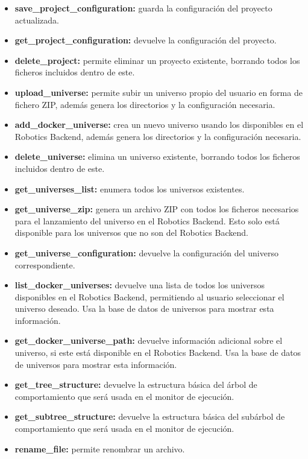 \begin{itemize}
    \item \textbf{save\_project\_configuration:} guarda la configuración del proyecto actualizada.
    \item \textbf{get\_project\_configuration:} devuelve la configuración del proyecto.
    \item \textbf{delete\_project:} permite eliminar un proyecto existente, borrando todos los ficheros incluidos dentro de este.
    \item \textbf{upload\_universe:} permite subir un universo propio del usuario en forma de fichero ZIP, además genera los directorios y la configuración necesaria.
    \item \textbf{add\_docker\_universe:} crea un nuevo universo usando los disponibles en el Robotics Backend, además genera los directorios y la configuración necesaria.
    \item \textbf{delete\_universe:} elimina un universo existente, borrando todos los ficheros incluidos dentro de este.
    \item \textbf{get\_universes\_list:} enumera todos los universos existentes.
    \item \textbf{get\_universe\_zip:} genera un archivo ZIP con todos los ficheros necesarios para el lanzamiento del universo en el Robotics Backend. Esto solo está disponible para los universos que no son del Robotics Backend.
    \item \textbf{get\_universe\_configuration:} devuelve la configuración del universo correspondiente.
    \item \textbf{list\_docker\_universes:} devuelve una lista de todos los universos disponibles en el Robotics Backend, permitiendo al usuario seleccionar el universo deseado. Usa la base de datos de universos para mostrar esta información.
    \item \textbf{get\_docker\_universe\_path:} devuelve información adicional sobre el universo, si este está disponible en el Robotics Backend. Usa la base de datos de universos para mostrar esta información.
    \item \textbf{get\_tree\_structure:} devuelve la estructura básica del árbol de comportamiento que será usada en el monitor de ejecución.
    \item \textbf{get\_subtree\_structure:} devuelve la estructura básica del subárbol de comportamiento que será usada en el monitor de ejecución.
    \item \textbf{rename\_file:} permite renombrar un archivo.

\end{itemize}
